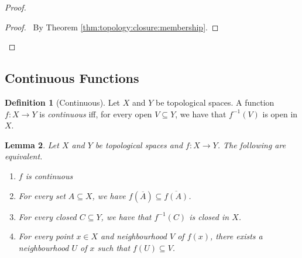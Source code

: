 \documentclass{book}
\newtheorem{lm}{Lemma}[chapter]
\theoremstyle{definition}
\newtheorem{df}[lm]{Definition}
\begin{document}
  \begin{proof}
    \pf
    \qedstep
    \begin{proof}
      \pf\ By Theorem \ref{thm:topology:closure:membership}.
    \end{proof}
  \end{proof}
  
  \subsection{Continuous Functions}
  
  \begin{df}[Continuous]
    Let $X$ and $Y$ be topological spaces. A function $f : X \rightarrow Y$ is 
    \emph{continuous} iff, for every open $V \subseteq Y$, we have that 
    $f^{-1}(V)$ 
    is open in $X$.
  \end{df}
  
  \begin{lm}
    \label{lm:topology:continuous:criteria}
    Let $X$ and $Y$ be topological spaces and $f : X \rightarrow Y$. The 
    following 
    are equivalent.
    \begin{enumerate}
      \item $f$ is continuous
      \item For every set $A \subseteq X$, we have $f(\overline{A}) \subseteq 
      \overline{f(A)}$.
      \item For every closed $C \subseteq Y$, we have that $f^{-1}(C)$ is closed 
      in 
      $X$.
      \item For every point $x \in X$ and neighbourhood $V$ of $f(x)$, there 
      exists a 
      neighbourhood $U$ of $x$ such that $f(U) \subseteq V$.
    \end{enumerate}
  \end{lm}
  
\end{document}
